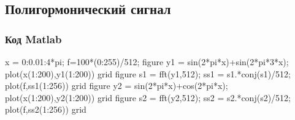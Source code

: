 \documentclass[10pt,a4paper]{article}
\begin{document}
\subsection{Полигормонический сигнал}
\subsubsection{Код Matlab}
x = 0:0.01:4*pi;\newline
f=100*(0:255)/512; \newline
figure\newline
y1 = sin(2*pi*x)+sin(2*pi*3*x);\newline
plot(x(1:200),y1(1:200))\newline
grid\newline
figure\newline
s1 = fft(y1,512);\newline
ss1 = s1.*conj(s1)/512;\newline
plot(f,ss1(1:256))\newline
grid \newline
figure\newline
y2 = sin(2*pi*x)+cos(2*pi*x);  \newline
plot(x(1:200),y2(1:200))  \newline 
grid \newline
figure\newline
s2 = fft(y2,512);\newline
ss2 = s2.*conj(s2)/512;\newline
plot(f,ss2(1:256))\newline
grid \newline
\end{document}
